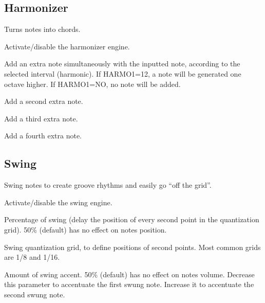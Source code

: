 \subsection{Harmonizer}

Turns notes into chords.


  

Activate/disable the harmonizer engine.

  \btn{\ldots} 

Add an extra note simultaneously with the inputted note, according to the selected interval (harmonic). If HARMO1=12, a note will be generated one octave higher. If HARMO1=NO, no note will be added.

  \btn{\ldots} 

Add a second extra note.

  \btn{\ldots} 

Add a third extra note.

  \btn{\ldots} 

Add a fourth extra note.

\subsection{Swing}

Swing notes to create groove rhythms and easily go ``off the grid''.


  

Activate/disable the swing engine.

  \btn{\ldots} 

Percentage of swing (delay the position of every second point in the quantization grid). 50\% (default) has no effect on notes position.

  \btn{\ldots} 

Swing quantization grid, to define positions of second points. Most common grids are 1/8 and 1/16.

  \btn{\ldots} 

Amount of swing accent. 50\% (default) has no effect on notes volume. Decrease this parameter to accentuate the first swung note. Increase it to accentuate the second swung note.


